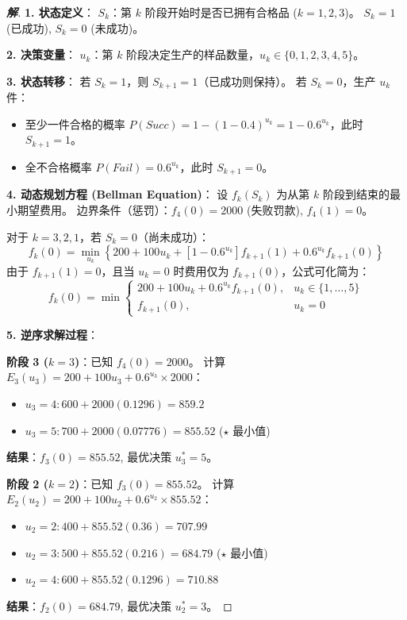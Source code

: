 \documentclass[a4paper,12pt]{ctexart} %
\newenvironment{solution}{\begin{proof}[\textbf{解}]}{\end{proof}}
\begin{document}
	\begin{solution}
		\textbf{1. 状态定义}：
		$S_k$：第 $k$ 阶段开始时是否已拥有合格品 ($k=1,2,3$)。
		$S_k=1$ (已成功), $S_k=0$ (未成功)。
		
		\textbf{2. 决策变量}：
		$u_k$：第 $k$ 阶段决定生产的样品数量，$u_k \in \{0, 1, 2, 3, 4, 5\}$。
		
		\textbf{3. 状态转移}：
		若 $S_k=1$，则 $S_{k+1}=1$（已成功则保持）。
		若 $S_k=0$，生产 $u_k$ 件：
		\begin{itemize}
			\item 至少一件合格的概率 $P(Succ) = 1 - (1-0.4)^{u_k} = 1 - 0.6^{u_k}$，此时 $S_{k+1}=1$。
			\item 全不合格概率 $P(Fail) = 0.6^{u_k}$，此时 $S_{k+1}=0$。
		\end{itemize}
		
		\textbf{4. 动态规划方程 (Bellman Equation)}：
		设 $f_k(S_k)$ 为从第 $k$ 阶段到结束的最小期望费用。
		边界条件（惩罚）：$f_4(0) = 2000$ (失败罚款), $f_4(1) = 0$。
		
		对于 $k=3,2,1$，若 $S_k=0$（尚未成功）：
		\[
		f_k(0) = \min_{u_k} \left\{ 200 + 100u_k + [1-0.6^{u_k}]f_{k+1}(1) + 0.6^{u_k}f_{k+1}(0) \right\}
		\]
		由于 $f_{k+1}(1)=0$，且当 $u_k=0$ 时费用仅为 $f_{k+1}(0)$，公式可化简为：
		\[
		f_k(0) = \min \begin{cases} 
			200 + 100u_k + 0.6^{u_k}f_{k+1}(0), & u_k \in \{1,\dots,5\} \\
			f_{k+1}(0), & u_k = 0
		\end{cases}
		\]
		
		\textbf{5. 逆序求解过程}：
		
		\textbf{阶段 3 ($k=3$)}：已知 $f_4(0)=2000$。
		计算 $E_3(u_3) = 200 + 100u_3 + 0.6^{u_3} \times 2000$：
		\begin{itemize}
			\item $u_3=4: 600 + 2000(0.1296) = 859.2$
			\item $u_3=5: 700 + 2000(0.07776) = 855.52$ \quad ($\star$ 最小值)
		\end{itemize}
		\textbf{结果}：$f_3(0) = 855.52$, 最优决策 $u_3^* = 5$。
		
		\textbf{阶段 2 ($k=2$)}：已知 $f_3(0)=855.52$。
		计算 $E_2(u_2) = 200 + 100u_2 + 0.6^{u_2} \times 855.52$：
		\begin{itemize}
			\item $u_2=2: 400 + 855.52(0.36) = 707.99$
			\item $u_2=3: 500 + 855.52(0.216) = 684.79$ \quad ($\star$ 最小值)
			\item $u_2=4: 600 + 855.52(0.1296) = 710.88$
		\end{itemize}
		\textbf{结果}：$f_2(0) = 684.79$, 最优决策 $u_2^* = 3$。
		

\end{solution}
\end{document}
